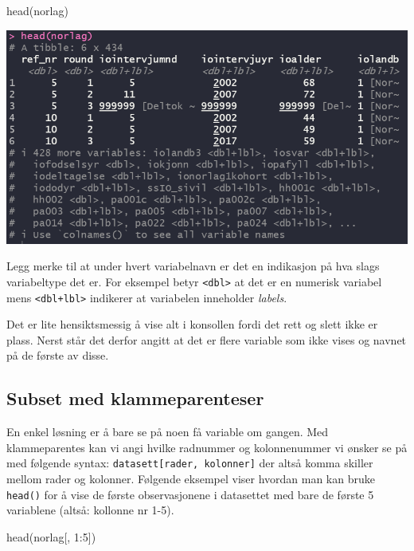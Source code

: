 \documentclass[
  letterpaper,
  DIV=11,
  numbers=noendperiod]{scrreprt}
\newenvironment{Shaded}{\begin{snugshade}}{\end{snugshade}}
\newcommand{\DecValTok}[1]{\textcolor[rgb]{0.68,0.00,0.00}{#1}}
\newcommand{\FunctionTok}[1]{\textcolor[rgb]{0.28,0.35,0.67}{#1}}
\newcommand{\NormalTok}[1]{\textcolor[rgb]{0.00,0.23,0.31}{#1}}
\newcommand{\SpecialCharTok}[1]{\textcolor[rgb]{0.37,0.37,0.37}{#1}}
\theoremstyle{definition}
\theoremstyle{remark}
\begin{document}
\begin{Shaded}
\begin{Highlighting}[]
\FunctionTok{head}\NormalTok{(norlag)}
\end{Highlighting}
\end{Shaded}

\includegraphics{./images/head_skjermdump.png}

Legg merke til at under hvert variabelnavn er det en indikasjon på hva
slags variabeltype det er. For eksempel betyr
\texttt{\textless{}dbl\textgreater{}} at det er en numerisk variabel
mens \texttt{\textless{}dbl+lbl\textgreater{}} indikerer at variabelen
inneholder \emph{labels}.

Det er lite hensiktsmessig å vise alt i konsollen fordi det rett og
slett ikke er plass. Nerst står det derfor angitt at det er flere
variable som ikke vises og navnet på de første av disse.

\hypertarget{subset-med-klammeparenteser}{%
\subsection{Subset med
klammeparenteser}\label{subset-med-klammeparenteser}}

En enkel løsning er å bare se på noen få variable om gangen. Med
klammeparentes kan vi angi hvilke radnummer og kolonnenummer vi ønsker
se på med følgende syntax: \texttt{datasett{[}rader,\ kolonner{]}} der
altså komma skiller mellom rader og kolonner. Følgende eksempel viser
hvordan man kan bruke \texttt{head()} for å vise de første
observasjonene i datasettet med bare de første 5 variablene (altså:
kollonne nr 1-5).

\begin{Shaded}
\begin{Highlighting}[]
\FunctionTok{head}\NormalTok{(norlag[, }\DecValTok{1}\SpecialCharTok{:}\DecValTok{5}\NormalTok{])}
\end{Highlighting}
\end{Shaded}
\end{document}
